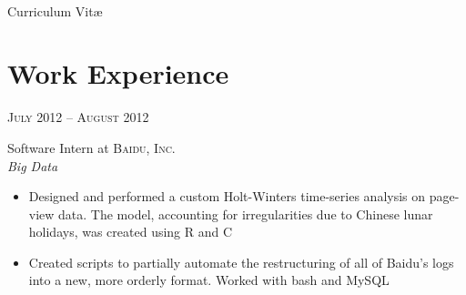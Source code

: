 \documentclass[10pt]{article} %
\begin{document}
\renewcommand{\labelitemi}{$\star$}

\color{text1} %


\par{\\ %
{\color{headings} Curriculum {Vit\ae}\\[15pt]\par} %
	

\begin{minipage}[t]{0.5\textwidth} %
\vspace{0pt} %
	

\section{Work Experience} 


{\raggedleft\textsc{July 2012 -- August 2012}\par}

{\raggedright\large Software Intern at \textsc{Baidu, Inc.}\\
\textit{Big Data}\\[5pt]}

\normalsize{
  \begin{itemize}
  \item Designed and performed a custom Holt-Winters time-series analysis
    on page-view data. The model, accounting for irregularities due to
    Chinese lunar holidays, was created using R and C
  \item Created scripts to partially automate the restructuring of all of
    Baidu's logs into a new, more orderly format. Worked with bash and
    MySQL
  \end{itemize}
}\\


\end{minipage}}
\end{document}
